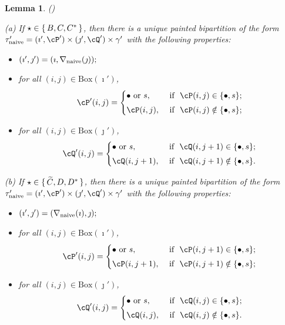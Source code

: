 \documentclass[11pt,a4paper]{amsart}
\def\DD{\nabla}
\numberwithin{equation}{section}
\newtheorem{lem}[thm]{Lemma}
\theoremstyle{remark}
\def\BOX{\mathrm{Box}}
\begin{document}
\begin{lem}(\cite[Lemmas 10.4 and 10.5]{BMSZa})
\label{lemDDn1} \label{lem:DDn}

\noindent (a) If $\star \in \set{B,C,C^*}$, then there is a unique painted bipartition of the form $\tau'_\mathrm{naive}= (\imath',\cP')\times (\jmath',\cQ')\times \gamma '$ with the following properties:
  \begin{itemize}
        \item $
   (\imath',\jmath')= (\imath,\DD_\mathrm{naive}(\jmath)); \smallskip
   $
   \item for all $(i,j)\in \BOX(\imath')$,
   \[
     \cP'(i,j)=\begin{cases}
    \bullet \textrm{ or } s,&\textrm{ if  $\ \cP(i,j)\in \{\bullet, s\}$;} \smallskip \\
  \cP(i,j),& \textrm{ if $\ \cP(i,j)\notin \{\bullet, s\}$};\end{cases}
   \]
   \item for all $(i,j)\in \BOX(\jmath')$,
   \[
     \cQ'(i,j)=\begin{cases}
    \bullet \textrm{ or } s,&\textrm{ if  $\ \cQ(i,j+1)\in \{\bullet, s\}$;} \smallskip \\
  \cQ(i,j+1), & \textrm{ if $\ \cQ(i,j+1)\notin \{\bullet, s\}$}.  \end{cases}
   \]
    \end{itemize}

\noindent (b) If $\star \in \set{ \widetilde C, D,D^*}$,
 then there is a unique painted bipartition of the form
 $\tau'_\mathrm{naive}= (\imath',\cP')\times (\jmath',\cQ')\times \gamma'$ with the following properties:
 \begin{itemize}
 \item $
 (\imath',\jmath')= (\DD_\mathrm{naive}(\imath),\jmath); \smallskip
 $
 \item for all $(i,j)\in \BOX(\imath')$,
 \[
 \cP'(i,j)=\begin{cases}
 \bullet \textrm{ or } s,&\textrm{ if  $\ \cP(i,j+1)\in \{\bullet, s\}$;} \smallskip \\
 \cP(i,j+1),& \textrm{ if $\ \cP(i,j+1)\notin \{\bullet, s\}$};\end{cases}
 \]
 \item for all $(i,j)\in \BOX(\jmath')$,
 \[
 \cQ'(i,j)=\begin{cases}
 \bullet \textrm{ or } s,&\textrm{ if  $\ \cQ(i,j)\in \{\bullet, s\}$;} \smallskip \\
 \cQ(i,j), & \textrm{ if $\ \cQ(i,j)\notin \{\bullet, s\}$}.  \end{cases}
 \]
 \end{itemize}
 \end{lem}
\end{document}
